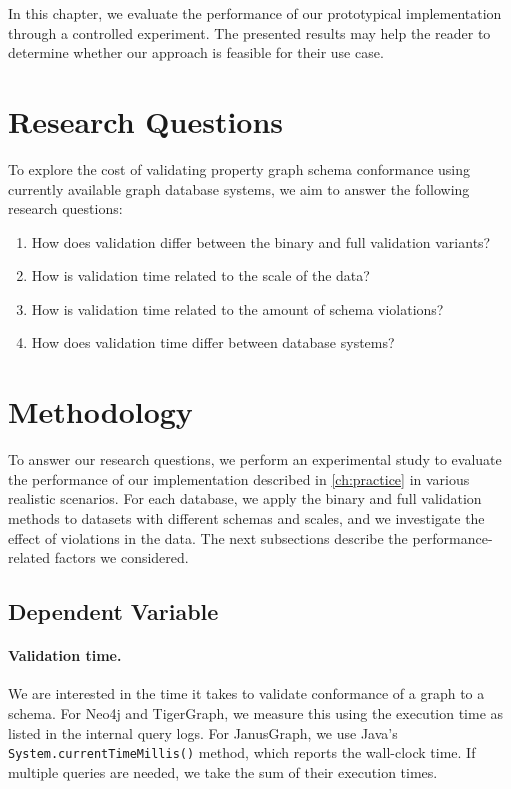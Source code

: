 \documentclass{report}
\theoremstyle{definition}
\begin{document}
In this chapter, we evaluate the performance of our prototypical implementation through a controlled experiment. The presented results may help the reader to determine whether our approach is feasible for their use case.

\section{Research Questions}

To explore the cost of validating property graph schema conformance using currently available graph database systems, we aim to answer the following research questions:

\begin{enumerate}[label=\bfseries RQ\arabic*,ref=RQ\arabic*]
  \item\label{rq:variant} How does validation differ between the binary and full validation variants?
  \item\label{rq:scale} How is validation time related to the scale of the data?
  \item\label{rq:violations} How is validation time related to the amount of schema violations?
  \item\label{rq:database} How does validation time differ between database systems?
\end{enumerate}

\section{Methodology}

To answer our research questions, we perform an experimental study to evaluate the performance of our implementation described in \autoref{ch:practice} in various realistic scenarios. For each database, we apply the binary and full validation methods to datasets with different schemas and scales, and we investigate the effect of violations in the data. The next subsections describe the performance-related factors we considered.

\subsection{Dependent Variable}

\paragraph{Validation time.} We are interested in the time it takes to validate conformance of a graph to a schema. For Neo4j and TigerGraph, we measure this using the execution time as listed in the internal query logs. For JanusGraph, we use Java's \texttt{System.currentTimeMillis()} method, which reports the wall-clock time. If multiple queries are needed, we take the sum of their execution times.
\end{document}
